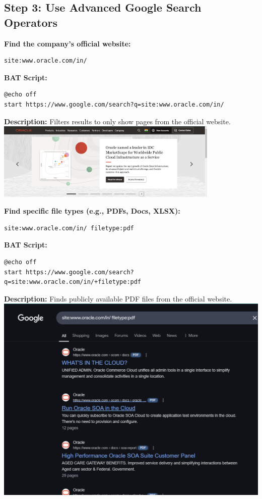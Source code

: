 \documentclass{article}
\begin{document}
\subsection{Step 3: Use Advanced Google Search Operators}
\textbf{Find the company's official website:}
\begin{lstlisting}
site:www.oracle.com/in/
\end{lstlisting}
\textbf{BAT Script:}
\begin{lstlisting}
@echo off
start https://www.google.com/search?q=site:www.oracle.com/in/
\end{lstlisting}
\textbf{Description:} Filters results to only show pages from the official website.
\includegraphics[width=0.8\textwidth]{images/official_website.png}

\textbf{Find specific file types (e.g., PDFs, Docs, XLSX):}
\begin{lstlisting}
site:www.oracle.com/in/ filetype:pdf
\end{lstlisting}
\textbf{BAT Script:}
\begin{lstlisting}
@echo off
start https://www.google.com/search?q=site:www.oracle.com/in/+filetype:pdf
\end{lstlisting}
\textbf{Description:} Finds publicly available PDF files from the official website.
\includegraphics[width=1.0\textwidth]{images/filetype_search.png}
\end{document}
